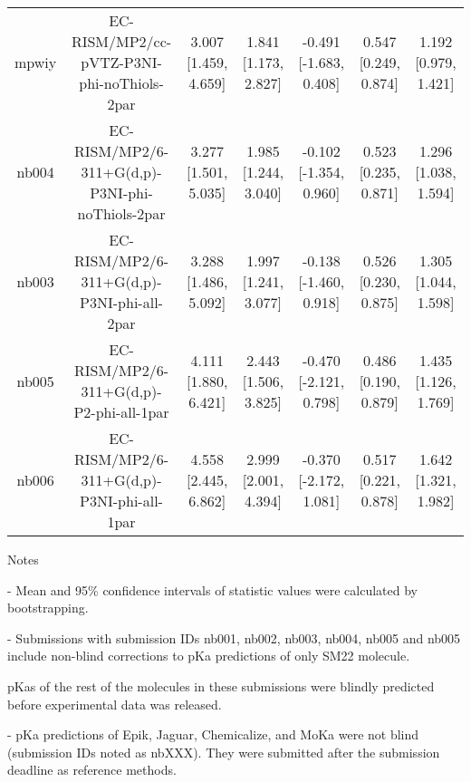 \documentclass{article}
\begin{document}
\begin{center}
\begin{longtable}{|ccccccc|}
 mpwiy &         EC-RISM/MP2/cc-pVTZ-P3NI-phi-noThiols-2par &  3.007 [1.459, 4.659] &  1.841 [1.173, 2.827] &   -0.491 [-1.683, 0.408] &  0.547 [0.249, 0.874] &   1.192 [0.979, 1.421] \\
 nb004 &    EC-RISM/MP2/6-311+G(d,p)-P3NI-phi-noThiols-2par &  3.277 [1.501, 5.035] &  1.985 [1.244, 3.040] &   -0.102 [-1.354, 0.960] &  0.523 [0.235, 0.871] &   1.296 [1.038, 1.594] \\
 nb003 &         EC-RISM/MP2/6-311+G(d,p)-P3NI-phi-all-2par &  3.288 [1.486, 5.092] &  1.997 [1.241, 3.077] &   -0.138 [-1.460, 0.918] &  0.526 [0.230, 0.875] &   1.305 [1.044, 1.598] \\
 nb005 &           EC-RISM/MP2/6-311+G(d,p)-P2-phi-all-1par &  4.111 [1.880, 6.421] &  2.443 [1.506, 3.825] &   -0.470 [-2.121, 0.798] &  0.486 [0.190, 0.879] &   1.435 [1.126, 1.769] \\
 nb006 &         EC-RISM/MP2/6-311+G(d,p)-P3NI-phi-all-1par &  4.558 [2.445, 6.862] &  2.999 [2.001, 4.394] &   -0.370 [-2.172, 1.081] &  0.517 [0.221, 0.878] &   1.642 [1.321, 1.982] \\
\end{longtable}
\end{center}

Notes

- Mean and 95\% confidence intervals of statistic values were calculated by bootstrapping.

- Submissions with submission IDs nb001, nb002, nb003, nb004, nb005 and nb005 include non-blind corrections to pKa predictions of only SM22 molecule.

pKas of the rest of the molecules in these submissions were blindly predicted before experimental data was released.

- pKa predictions of Epik, Jaguar, Chemicalize, and MoKa were not blind (submission IDs noted as nbXXX). They were submitted after the submission deadline as reference methods.
\end{document}
